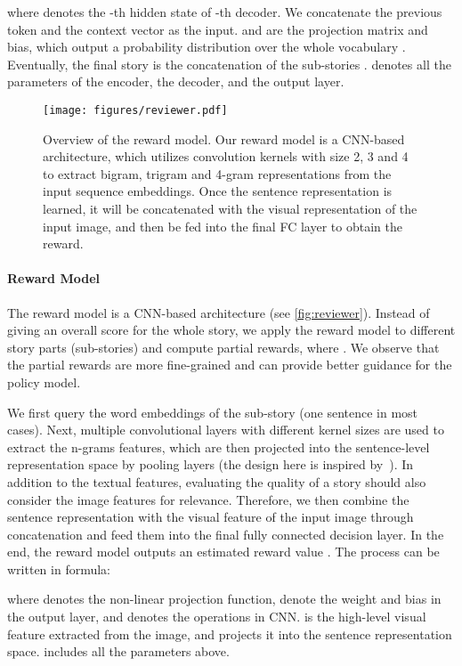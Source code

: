 \documentclass[11pt,a4paper]{article}
\begin{document}
where  denotes the -th hidden state of -th decoder. We concatenate the previous token  and the context vector  as the input.  and  are the projection matrix and bias, which output a probability distribution over the whole vocabulary . Eventually, the final story  is the concatenation of the sub-stories .  denotes all the parameters of the encoder, the decoder, and the output layer.

\begin{figure}[!t]
\begin{center}
\texttt{[image: figures/reviewer.pdf]}  
\end{center}
\caption{Overview of the reward model. Our reward model is a CNN-based architecture, which utilizes convolution kernels with size 2, 3 and 4 to extract bigram, trigram and 4-gram representations from the input sequence embeddings. Once the sentence representation is learned, it will be concatenated with the visual representation of the input image, and then be fed into the final FC layer to obtain the reward.}
\label{fig:reviewer}
\end{figure}

\paragraph{Reward Model} The reward model  is a CNN-based architecture (see \autoref{fig:reviewer}).  
Instead of giving an overall score for the whole story, we apply the reward model to different story parts (sub-stories)  and compute partial rewards, where . We observe that the partial rewards are more fine-grained and can provide better guidance for the policy model. 

We first query the word embeddings of the sub-story (one sentence in most cases). Next, multiple convolutional layers with different kernel sizes are used to extract the n-grams features, which are then projected into the sentence-level representation space by pooling layers (the design here is inspired by~\citet{kim2014convolutional}). In addition to the textual features, evaluating the quality of a story should also consider the image features for relevance. Therefore, we then combine the sentence representation with the visual feature of the input image through concatenation and feed them into the final fully connected decision layer. In the end, the reward model outputs an estimated reward value . The process can be written in formula:

where  denotes the non-linear projection function,  denote the weight and bias in the output layer, and  denotes the operations in CNN.  is the high-level visual feature extracted from the image, and  projects it into the sentence representation space.  includes all the parameters above.
\end{document}
